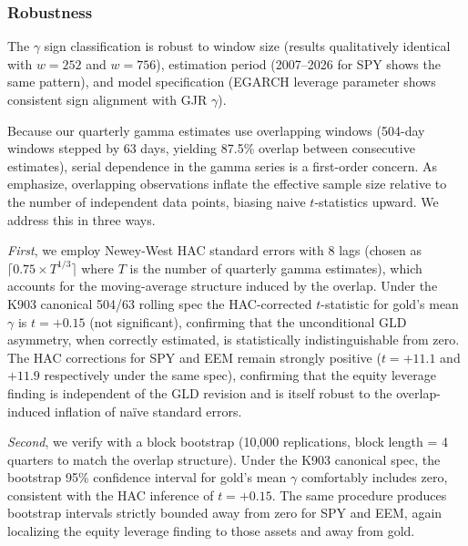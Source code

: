 \subsubsection{Robustness}

The $\gamma$ sign classification is robust to window size (results qualitatively identical with $w = 252$ and $w = 756$), estimation period (2007--2026 for SPY shows the same pattern), and model specification (EGARCH leverage parameter shows consistent sign alignment with GJR $\gamma$).

Because our quarterly gamma estimates use overlapping windows (504-day windows stepped by 63 days, yielding 87.5\% overlap between consecutive estimates), serial dependence in the gamma series is a first-order concern. As \citet{harri2009} emphasize, overlapping observations inflate the effective sample size relative to the number of independent data points, biasing naive $t$-statistics upward. We address this in three ways.

\textit{First}, we employ Newey-West HAC standard errors \citep{newey1987} with 8 lags (chosen as $\lceil 0.75 \times T^{1/3} \rceil$ where $T$ is the number of quarterly gamma estimates), which accounts for the moving-average structure induced by the overlap. Under the K903 canonical 504/63 rolling spec the HAC-corrected $t$-statistic for gold's mean $\gamma$ is $t = +0.15$ (not significant), confirming that the unconditional GLD asymmetry, when correctly estimated, is statistically indistinguishable from zero. The HAC corrections for SPY and EEM remain strongly positive ($t = +11.1$ and $+11.9$ respectively under the same spec), confirming that the equity leverage finding is independent of the GLD revision and is itself robust to the overlap-induced inflation of na\"ive standard errors.

\textit{Second}, we verify with a block bootstrap (10,000 replications, block length = 4 quarters to match the overlap structure). Under the K903 canonical spec, the bootstrap 95\% confidence interval for gold's mean $\gamma$ comfortably includes zero, consistent with the HAC inference of $t = +0.15$. The same procedure produces bootstrap intervals strictly bounded away from zero for SPY and EEM, again localizing the equity leverage finding to those assets and away from gold.


